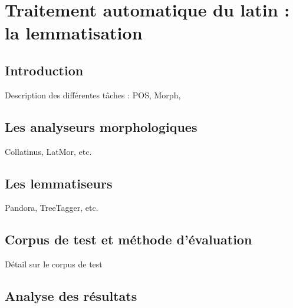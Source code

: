 \section{Traitement automatique du latin : la lemmatisation}
\label{sec:lemmatiseurs}

\subsection{Introduction}
\label{subsec:lemma_intro}

Description des différentes tâches :
POS, Morph,

\subsection{Les analyseurs morphologiques}
\label{subsec:lemma_morph}

Collatinus, LatMor, etc.

\subsection{Les lemmatiseurs}
\label{subsec:lemma_lemmatiseurs}

Pandora, TreeTagger, etc.


\subsection{Corpus de test et méthode d'évaluation}
\label{subsec:lemma_corpus}

Détail sur le corpus de test

\subsection{Analyse des résultats}
\label{subsec:lemma_resultats}
